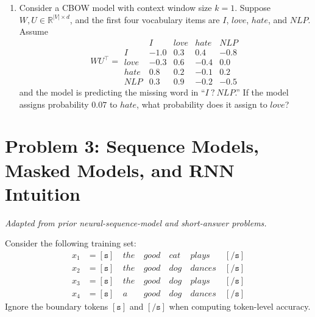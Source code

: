 \begin{enumerate}[label=(\alph*)]
\item Consider a CBOW model with context window size \(k=1\). Suppose \(W,U \in \mathbb{R}^{|V|\times d}\), and the first four vocabulary items are \(I\), \(love\), \(hate\), and \(NLP\). Assume
\[
W U^\top =
\begin{array}{c|rrrr}
 & I & love & hate & NLP \\
\hline
I    & -1.0 & 0.3 & 0.4 & -0.8 \\
love & -0.3 & 0.6 & -0.4 & 0.0 \\
hate & 0.8  & 0.2 & -0.1 & 0.2 \\
NLP  & 0.3  & 0.9 & -0.2 & -0.5
\end{array}
\]
and the model is predicting the missing word in ``\(I\ ?\ NLP\).'' If the model assigns probability \(0.07\) to \(hate\), what probability does it assign to \(love\)?
\end{enumerate}



\section*{Problem 3: Sequence Models, Masked Models, and RNN Intuition}
\textit{Adapted from prior neural-sequence-model and short-answer problems.}

Consider the following training set:
\[
\begin{aligned}
x_1 &= [\texttt{s}]~&the~&good~&cat~&plays~&[\texttt{/s}] \\
x_2 &= [\texttt{s}]~&the~&good~&dog~&dances~&[\texttt{/s}] \\
x_3 &= [\texttt{s}]~&the~&good~&dog~&plays~&[\texttt{/s}] \\
x_4 &= [\texttt{s}]~&a~&good~&dog~&dances~&[\texttt{/s}]
\end{aligned}
\]
Ignore the boundary tokens \([\texttt{s}]\) and \([\texttt{/s}]\) when computing token-level accuracy.

